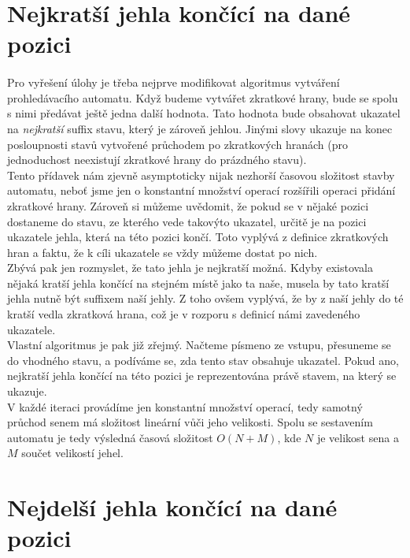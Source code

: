 \documentclass{scrartcl}
\begin{document}
\section{Nejkratší jehla končící na dané pozici}
\paragraph{}
Pro vyřešení úlohy je třeba nejprve modifikovat algoritmus vytváření prohledávacího automatu. Když budeme vytvářet zkratkové hrany, bude se spolu s nimi předávat ještě jedna další hodnota. Tato hodnota bude obsahovat ukazatel na \textit{nejkratší} suffix stavu, který je zároveň jehlou. Jinými slovy ukazuje na konec posloupnosti stavů vytvořené průchodem po zkratkových hranách (pro jednoduchost neexistují zkratkové hrany do prázdného stavu). \\

Tento přídavek nám zjevně asymptoticky nijak nezhorší časovou složitost stavby automatu, neboť jsme jen o konstantní množství operací rozšířili operaci přidání zkratkové hrany. Zároveň si můžeme uvědomit, že pokud se v nějaké pozici dostaneme do stavu, ze kterého vede takovýto ukazatel, určitě je na pozici ukazatele jehla, která na této pozici končí. Toto vyplývá z definice zkratkových hran a faktu, že k cíli ukazatele se vždy můžeme dostat po nich. \\

Zbývá pak jen rozmyslet, že tato jehla je nejkratší možná. Kdyby existovala nějaká kratší jehla končící na stejném místě jako ta naše, musela by tato kratší jehla nutně být suffixem naší jehly. Z toho ovšem vyplývá, že by z naší jehly do té kratší vedla zkratková hrana, což je v rozporu s definicí námi zavedeného ukazatele. \\

Vlastní algoritmus je pak již zřejmý. Načteme písmeno ze vstupu, přesuneme se do vhodného stavu, a podíváme se, zda tento stav obsahuje ukazatel. Pokud ano, nejkratší jehla končící na této pozici je reprezentována právě stavem, na který se ukazuje. \\

V každé iteraci provádíme jen konstantní množství operací, tedy samotný průchod senem má složitost lineární vůči jeho velikosti. Spolu se sestavením automatu je tedy výsledná časová složitost $O(N + M)$, kde $N$ je velikost sena a $M$ součet velikostí jehel.

\section{Nejdelší jehla končící na dané pozici}
\end{document}
